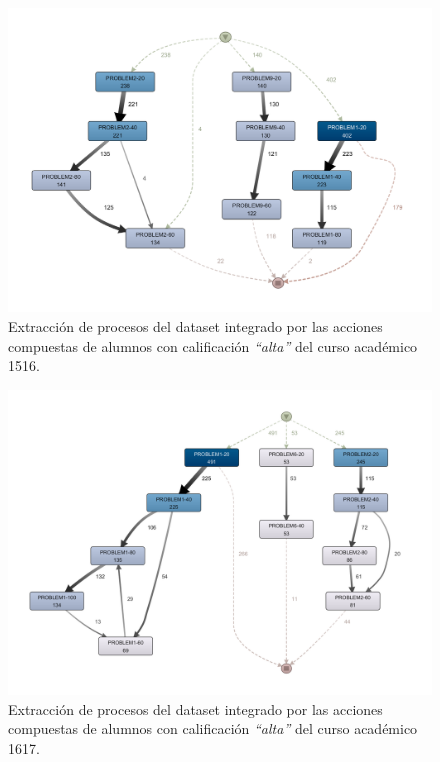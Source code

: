 \begin{figure}[H]
    \centering
    \includegraphics[width=1.25\textwidth]{imagenes/Year1516HighGrades.png}
    \caption{Extracción de procesos del dataset integrado por las acciones compuestas de alumnos con calificación \emph{``alta''} del curso académico 1516.}
    \label{fig:year1516BestGrades}
\end{figure}

\begin{figure}[H]
    \centering
    \includegraphics[width=1.25\textwidth]{imagenes/Year1617HighGrades.png}
    \caption{Extracción de procesos del dataset integrado por las acciones compuestas de alumnos con calificación \emph{``alta''} del curso académico 1617.}
    \label{fig:year1617BestGrades}
\end{figure}

